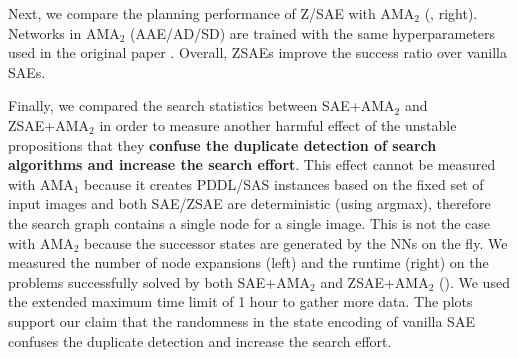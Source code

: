 Next, we compare the planning performance of Z/SAE with AMA$_2$ (, right).
Networks in AMA$_2$ (AAE/AD/SD) are trained with the same hyperparameters
used in the original paper \cite{Asai2018}.
Overall, ZSAEs improve the success ratio over vanilla SAEs.

Finally, we compared the search statistics between SAE+AMA$_2$ and ZSAE+AMA$_2$
in order to measure another harmful effect of the unstable propositions
that they \textbf{confuse the duplicate detection of search algorithms and increase the search effort}.
% 
This effect cannot be measured with AMA$_1$
because it creates PDDL/SAS instances based on the fixed set of
input images and both SAE/ZSAE are deterministic (using argmax),
therefore the search graph contains a single node for a single image.
This is not the case with AMA$_2$ because the successor states
are generated by the NNs on the fly.
% 
We measured the number of node expansions (left) and the runtime (right)
on the problems successfully solved by both SAE+AMA$_2$ and ZSAE+AMA$_2$ ().
We used the extended maximum time limit of 1 hour to gather more data.
The plots support our claim that
the randomness in the state encoding of vanilla SAE confuses the duplicate detection and
increase the search effort.

